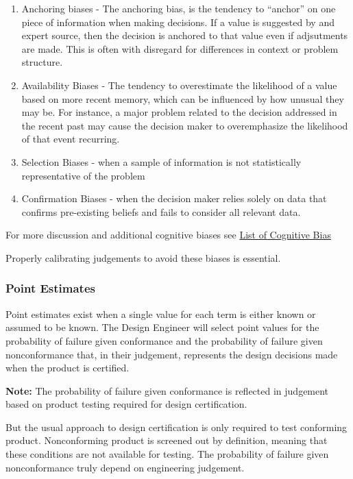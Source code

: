 \documentclass[
]{article}
\begin{document}
\begin{enumerate}
\def\labelenumi{\arabic{enumi}.}
\item
  Anchoring biases - The anchoring bias, is the tendency to ``anchor'' on one piece of information when making decisions. If a value is suggested by and expert source, then the decision is anchored to that value even if adjsutments are made. This is often with disregard for differences in context or problem structure.
\item
  Availability Biases - The tendency to overestimate the likelihood of a value based on more recent memory, which can be influenced by how unusual they may be. For instance, a major problem related to the decision addressed in the recent past may cause the decision maker to overemphasize the likelihood of that event recurring.
\item
  Selection Biases - when a sample of information is not statistically representative of the problem
\item
  Confirmation Biases - when the decision maker relies solely on data that confirms pre-existing beliefs and fails to consider all relevant data.
\end{enumerate}

For more discussion and additional cognitive biases see \href{https://en.wikipedia.org/wiki/List_of_cognitive_biases}{List of Cognitive Bias}

Properly calibrating judgements to avoid these biases is essential.

\subsubsection{Point Estimates}\label{point-estimates}

Point estimates exist when a single value for each term is either known or assumed to be known. The Design Engineer will select point values for the probability of failure given conformance and the probability of failure given nonconformance that, in their judgement, represents the design decisions made when the product is certified.

\textbf{Note:} The probability of failure given conformance is reflected in judgement based on product testing required for design certification.

But the usual approach to design certification is only required to test conforming product. Nonconforming product is screened out by definition, meaning that these conditions are not available for testing. The probability of failure given nonconformance truly depend on engineering judgement.
\end{document}
